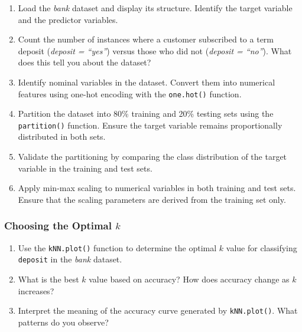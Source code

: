 \documentclass[
  11pt,
]{book}
\newcommand{\passthrough}[1]{#1}
\providecommand{\tightlist}{%
  \setlength{\itemsep}{0pt}\setlength{\parskip}{0pt}}
\theoremstyle{definition}
\theoremstyle{definition}
\theoremstyle{definition}
\theoremstyle{definition}
\theoremstyle{remark}
\begin{document}
\begin{enumerate}
\def\labelenumi{\arabic{enumi}.}
\setcounter{enumi}{10}
\tightlist
\item
  Load the \emph{bank} dataset and display its structure. Identify the target variable and the predictor variables.\\
\item
  Count the number of instances where a customer subscribed to a term deposit (\emph{deposit = ``yes''}) versus those who did not (\emph{deposit = ``no''}). What does this tell you about the dataset?\\
\item
  Identify nominal variables in the dataset. Convert them into numerical features using one-hot encoding with the \passthrough{\lstinline!one.hot()!} function.\\
\item
  Partition the dataset into 80\% training and 20\% testing sets using the \passthrough{\lstinline!partition()!} function. Ensure the target variable remains proportionally distributed in both sets.\\
\item
  Validate the partitioning by comparing the class distribution of the target variable in the training and test sets.\\
\item
  Apply min-max scaling to numerical variables in both training and test sets. Ensure that the scaling parameters are derived from the training set only.
\end{enumerate}

\subsubsection*{\texorpdfstring{Choosing the Optimal \(k\)}{Choosing the Optimal k}}\label{choosing-the-optimal-k}


\begin{enumerate}
\def\labelenumi{\arabic{enumi}.}
\setcounter{enumi}{16}
\tightlist
\item
  Use the \passthrough{\lstinline!kNN.plot()!} function to determine the optimal \(k\) value for classifying \passthrough{\lstinline!deposit!} in the \emph{bank} dataset.\\
\item
  What is the best \(k\) value based on accuracy? How does accuracy change as \(k\) increases?
\item
  Interpret the meaning of the accuracy curve generated by \passthrough{\lstinline!kNN.plot()!}. What patterns do you observe?
\end{enumerate}
\end{document}
